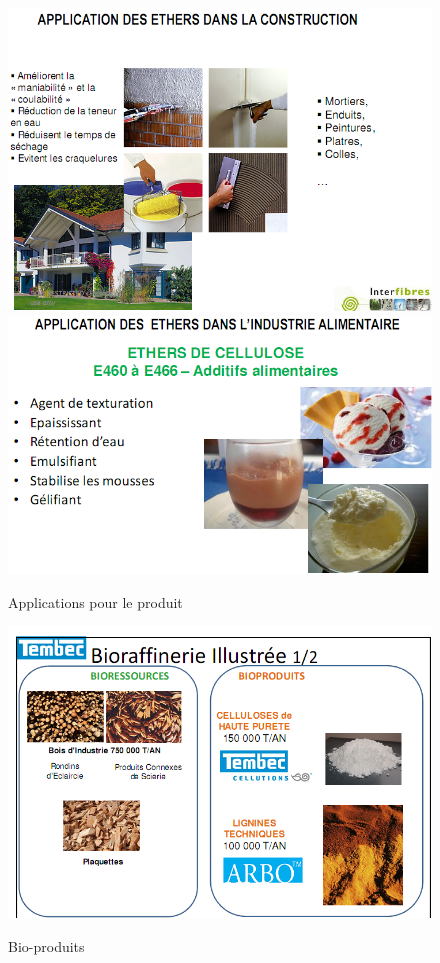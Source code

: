 \begin{figure}
	\begin{center}
		\includegraphics[width=0.8\linewidth]{img/applications.png} \\
		\vspace{2cm}
		\includegraphics[width=0.8\linewidth]{img/applications2.png}
		\caption{Applications pour le produit}
		\label{fig:applications}
	\end{center}
\end{figure}

\begin{figure}
	\begin{center}
		\includegraphics[width=0.8\linewidth]{img/bioproduits.png} \\
		\caption{Bio-produits}
		\label{fig:bioproduits}
	\end{center}
\end{figure}

